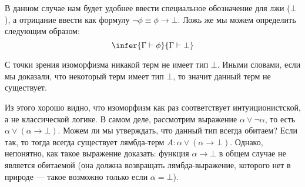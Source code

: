 В данном случае нам будет удобнее ввести специальное обозначение для лжи ($\bot$), а отрицание ввести
как формулу $\neg\phi \equiv \phi \rightarrow \bot$. Ложь же мы можем определить следующим образом:
$$\infer{\Gamma\vdash\phi}{\Gamma\vdash\bot}$$

С точки зрения изоморфизма никакой терм не имеет тип $\bot$. Иными словами, если мы доказали, что некоторый
терм имеет тип $\bot$, то значит данный терм не существует. 


Из этого хорошо видно, что изоморфизм 
как раз соответствует интуиционистской, а не классической логике. В самом деле, рассмотрим выражение
$\alpha\vee\neg\alpha$, то есть $\alpha\vee(\alpha\rightarrow\bot)$. Можем ли мы утверждать, что
данный тип всегда обитаем? Если так, то тогда всегда существует лямбда-терм $A: \alpha\vee(\alpha\rightarrow\bot)$.
Однако, непонятно, как такое выражение доказать: функция $\alpha\rightarrow\bot$ в общем случае не 
является обитаемой (она должна возвращать лямбда-выражение, которого нет в природе --- такое возможно только если $\alpha = \bot$).

